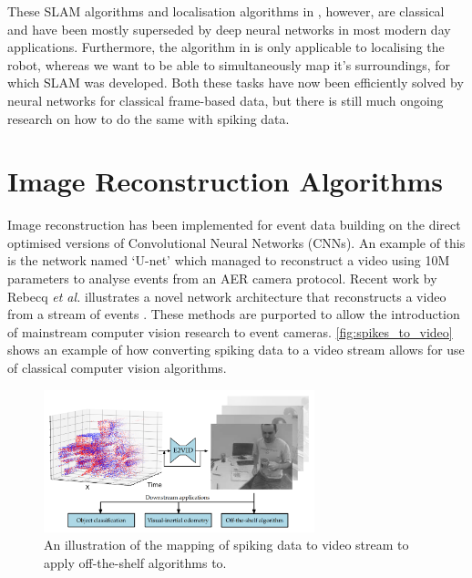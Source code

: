 These SLAM algorithms and localisation algorithms in , however, are classical and have been mostly superseded by deep neural networks in most modern day applications. Furthermore, the algorithm in  is only applicable to localising the robot, whereas we want to be able to simultaneously map it's surroundings, for which SLAM  was developed. Both these tasks have now been efficiently solved by neural networks for classical frame-based data, but there is still much ongoing research on how to do the same with spiking data.

\section{Image Reconstruction Algorithms} \label{ssec:image_reconstruction}

Image reconstruction has been implemented for event data building on the direct optimised versions of Convolutional Neural Networks (CNNs). An example of this is the network named `U-net'\cite{UNET} which managed to reconstruct a video using 10M parameters to analyse events from an AER camera protocol. Recent work by Rebecq \textit{et al.} illustrates a novel network architecture that reconstructs a video from a stream of events \cite{spikingToVideo}. These methods are purported to allow the introduction of mainstream computer vision research to event cameras. \autoref{fig:spikes_to_video} shows an example of how converting spiking data to a video stream allows for use of classical computer vision algorithms.

\begin{figure}[htb]
      \centering
      \includegraphics[width=0.7\textwidth]{background/images/spikes_to_video.png}
      \caption{An illustration of the mapping of spiking data to video stream to apply off-the-shelf algorithms to\cite{spikingToVideo}.}
      \label{fig:spikes_to_video}
\end{figure}


